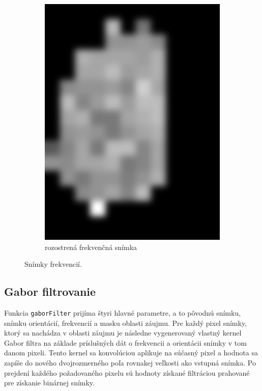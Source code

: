 \begin{figure}[h]
\begin{subfigure}[b]{0.3\linewidth}
      \includegraphics[width=\linewidth]{obrazky-figures/freqim_blur.png}
      \caption{rozostrená frekvenčná snímka}
    \end{subfigure}
    \caption{Snímky frekvencií.}
    \label{obr:frekvencie}
  \end{figure}

  \subsection{Gabor filtrovanie} \label{sec:gabor_algo}
  Funkcia \texttt{gaborFilter} prijíma štyri hlavné parametre, a to pôvodnú snímku, snímku orientácií, frekvencií a masku oblasti záujmu. Pre každý pixel
  snímky, ktorý sa nachádza v oblasti záujmu je následne vygenerovaný vlastný kernel Gabor filtra na základe príslušných dát o frekvencii a orientácii
  snímky v tom danom pixeli. Tento kernel sa konvolúciou aplikuje na súčasný pixel a hodnota sa zapíše do nového dvojrozmerného poľa rovnakej veľkosti ako
  vstupná snímka. Po prejdení každého požadovaného pixelu sú hodnoty získané filtráciou prahované pre získanie binárnej snímky.

